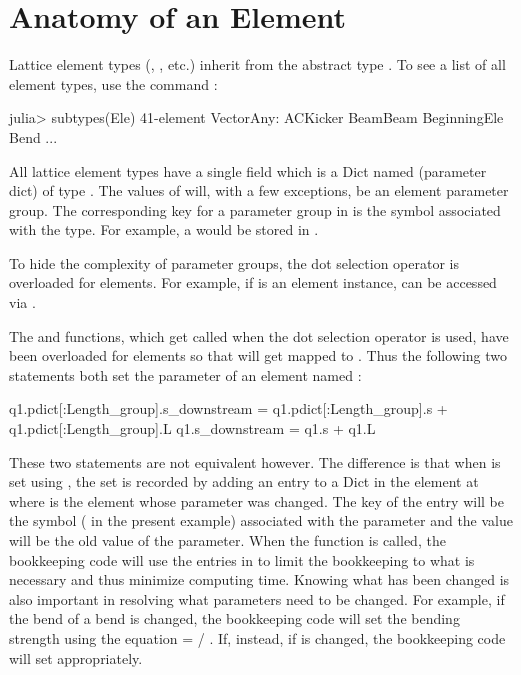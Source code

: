 \section{Anatomy of an Element}
\label{s:ele.anatomy}

Lattice element types (, , etc.) inherit from the abstract 
type . To see a list of all element types, use the command :
\begin{example}
  julia> subtypes(Ele)
  41-element Vector{Any}:
   ACKicker
   BeamBeam
   BeginningEle
   Bend
   ...
\end{example}

All lattice element types have a single field which is a Dict named  (parameter dict)
of type . 
The values of  will, with a few exceptions, be an
element parameter group. The corresponding key for a parameter group in  is the symbol associated 
with the type. For example, a  would be stored in .

To hide the complexity of parameter groups, the dot selection operator is overloaded for elements.
For example, if  is an element instance,  can be accessed
via .

The  and  functions, which get called when the dot
selection operator is used, have been overloaded for elements so that  will get mapped to 
. Thus the following two statements both set the 
parameter of an element named :
\begin{example}
  q1.pdict[:Length_group].s_downstream = q1.pdict[:Length_group].s + 
                                                     q1.pdict[:Length_group].L
  q1.s_downstream = q1.s + q1.L
\end{example}
These two statements are not equivalent however. The difference is that when 
is set using , the set is recorded by adding an entry to a 
Dict in the element at  where  is the element whose parameter
was changed. The key of the entry will be the symbol ( in the present example)
associated with the parameter and the value will be the old value of the parameter. When
the  function is called, the bookkeeping code will use the
entries in  to limit the bookkeeping to what is necessary and thus
minimize computing time. Knowing what has been changed is also important in resolving what
parameters need to be changed. 
For example, if the bend  of a bend is changed, the bookkeeping code will set the 
bending strength  using the equation  =  / . If, instead, if
 is changed, the bookkeeping code will set  appropriately. 



